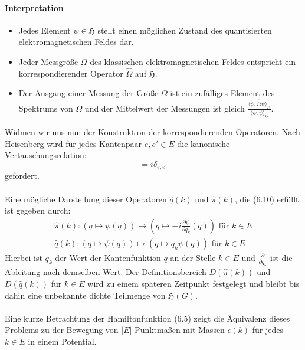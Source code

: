 \documentclass[11pt,a4paper,leqno]{report}
\numberwithin{equation}{chapter}
\begin{document}
\paragraph{Interpretation}
\begin{itemize}
\item Jedes Element $\psi\in\mathfrak{H}$ stellt einen m\"oglichen Zustand des quantisierten elektromagnetischen Feldes dar. 
\item Jeder Messgr\"o\ss{}e $\Omega$ des klassischen elektromagnetischen Feldes entspricht ein korrespondierender Operator $\hat{\Omega}$ auf $\mathfrak{H}$. 
\item Der Ausgang einer Messung der Gr\"o\ss{}e $\Omega$ ist ein zuf\"alliges Element des Spektrums von $\Omega$ und der Mittelwert der Messungen ist gleich $\frac{\langle \psi, \hat{\Omega}\psi\rangle_{\mathfrak{H}}}{\langle \psi, \psi\rangle_{\mathfrak{H}}}$.
\end{itemize}
\noindent
Widmen wir uns nun der Konstruktion der korrespondierenden Operatoren. Nach Heisenberg wird f\"ur jedes Kantenpaar $e,e'\in E$ die kanonische Vertauschungsrelation:
\begin{equation}
	[\hat{q}(e), \hat{\pi}(e')] = i\delta_{e, e'}
\end{equation}
gefordert.\\
\\
Eine m\"ogliche Darstellung dieser Operatoren $\hat{q}(k)$ und $\hat{\pi}(k)$, die (6.10) erf\"ullt ist gegeben durch:
\begin{align}
	\hat{\pi}(k):(q\mapsto\psi(q)) \mapsto (q\mapsto -i\frac{\partial\psi}{\partial q_k}(q))\text{  f\"ur }k\in E\\
	\hat{q}(k):(q\mapsto\psi(q)) \mapsto (q\mapsto q_k\psi(q))\text{  f\"ur }k\in E
\end{align}
\noindent
Hierbei ist $q_k$ der Wert der Kantenfunktion $q$ an der Stelle $k\in E$ und $\frac{\partial}{\partial q_k}$ ist die Ableitung nach demselben Wert. Der Definitionsbereich $D(\hat{\pi}(k))$ und $D(\hat{q}(k))$ f\"ur $k\in E$ wird zu einem sp\"ateren Zeitpunkt festgelegt und bleibt bis dahin eine unbekannte dichte Teilmenge von $\mathfrak{H}(G)$.
\\
\\
Eine kurze Betrachtung der Hamiltonfunktion (6.5) zeigt die \"Aquivalenz dieses Problems zu der Bewegung von $|E|$ Punktma\ss{}en mit Massen $\epsilon(k)$ f\"ur jedes $k\in E$ in einem Potential. 
\end{document}
